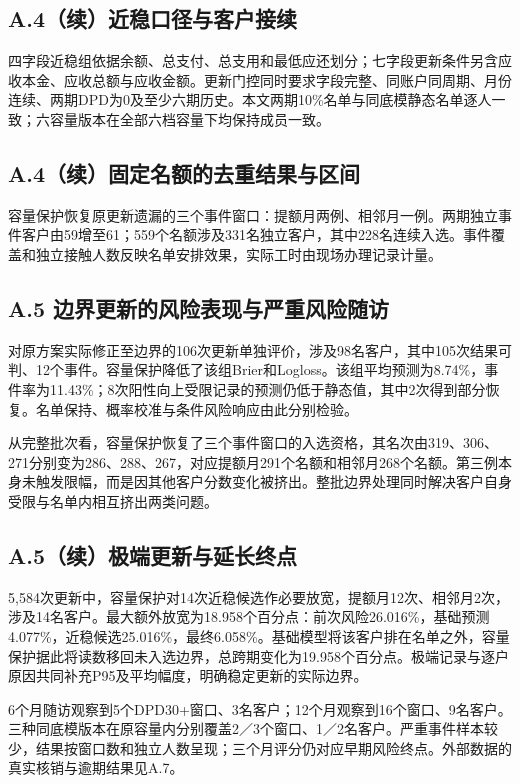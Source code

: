 \documentclass[a4paper,10pt]{article}
\begin{document}
\clearpage\subsection*{A.4（续）近稳口径与客户接续}


四字段近稳组依据余额、总支付、总支用和最低应还划分；七字段更新条件另含应收本金、应收总额与应收金额。更新门控同时要求字段完整、同账户同周期、月份连续、两期DPD为0及至少六期历史。本文两期10\%名单与同底模静态名单逐人一致；六容量版本在全部六档容量下均保持成员一致。

\clearpage\subsection*{A.4（续）固定名额的去重结果与区间}


容量保护恢复原更新遗漏的三个事件窗口：提额月两例、相邻月一例。两期独立事件客户由59增至61；559个名额涉及331名独立客户，其中228名连续入选。事件覆盖和独立接触人数反映名单安排效果，实际工时由现场办理记录计量。

\clearpage\subsection*{A.5 边界更新的风险表现与严重风险随访}


对原方案实际修正至边界的106次更新单独评价，涉及98名客户，其中105次结果可判、12个事件。容量保护降低了该组Brier和Logloss。该组平均预测为8.74\%，事件率为11.43\%；8次阳性向上受限记录的预测仍低于静态值，其中2次得到部分恢复。名单保持、概率校准与条件风险响应由此分别检验。

从完整批次看，容量保护恢复了三个事件窗口的入选资格，其名次由319、306、271分别变为286、288、267，对应提额月291个名额和相邻月268个名额。第三例本身未触发限幅，而是因其他客户分数变化被挤出。整批边界处理同时解决客户自身受限与名单内相互挤出两类问题。

\clearpage\subsection*{A.5（续）极端更新与延长终点}
5,584次更新中，容量保护对14次近稳候选作必要放宽，提额月12次、相邻月2次，涉及14名客户。最大额外放宽为18.958个百分点：前次风险26.016\%，基础预测4.077\%，近稳候选25.016\%，最终6.058\%。基础模型将该客户排在名单之外，容量保护据此将读数移回未入选边界，总跨期变化为19.958个百分点。极端记录与逐户原因共同补充P95及平均幅度，明确稳定更新的实际边界。


6个月随访观察到5个DPD30+窗口、3名客户；12个月观察到16个窗口、9名客户。三种同底模版本在原容量内分别覆盖2／3个窗口、1／2名客户。严重事件样本较少，结果按窗口数和独立人数呈现；三个月评分仍对应早期风险终点。外部数据的真实核销与逾期结果见A.7。
\end{document}
